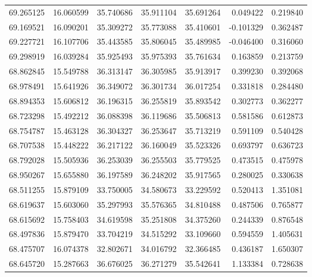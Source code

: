 \begin{tabular}{rrrrrrr}
 69.265125 &  16.060599 &         35.740686 &         35.911104 &         35.691264 &  0.049422 &  0.219840 \\
 69.169521 &  16.090201 &         35.309272 &         35.773088 &         35.410601 & -0.101329 &  0.362487 \\
 69.227721 &  16.107706 &         35.443585 &         35.806045 &         35.489985 & -0.046400 &  0.316060 \\
 69.298919 &  16.039284 &         35.925493 &         35.975393 &         35.761634 &  0.163859 &  0.213759 \\
 68.862845 &  15.549788 &         36.313147 &         36.305985 &         35.913917 &  0.399230 &  0.392068 \\
 68.978491 &  15.641926 &         36.349072 &         36.301734 &         36.017254 &  0.331818 &  0.284480 \\
 68.894353 &  15.606812 &         36.196315 &         36.255819 &         35.893542 &  0.302773 &  0.362277 \\
 68.723298 &  15.492212 &         36.088398 &         36.119686 &         35.506813 &  0.581586 &  0.612873 \\
 68.754787 &  15.463128 &         36.304327 &         36.253647 &         35.713219 &  0.591109 &  0.540428 \\
 68.707538 &  15.448222 &         36.217122 &         36.160049 &         35.523326 &  0.693797 &  0.636723 \\
 68.792028 &  15.505936 &         36.253039 &         36.255503 &         35.779525 &  0.473515 &  0.475978 \\
 68.950267 &  15.655880 &         36.197589 &         36.248202 &         35.917565 &  0.280025 &  0.330638 \\
 68.511255 &  15.879109 &         33.750005 &         34.580673 &         33.229592 &  0.520413 &  1.351081 \\
 68.619637 &  15.603060 &         35.297993 &         35.576365 &         34.810488 &  0.487506 &  0.765877 \\
 68.615692 &  15.758403 &         34.619598 &         35.251808 &         34.375260 &  0.244339 &  0.876548 \\
 68.497836 &  15.879470 &         33.704219 &         34.515292 &         33.109660 &  0.594559 &  1.405631 \\
 68.475707 &  16.074378 &         32.802671 &         34.016792 &         32.366485 &  0.436187 &  1.650307 \\
 68.645720 &  15.287663 &         36.676025 &         36.271279 &         35.542641 &  1.133384 &  0.728638 \\

\end{tabular}
